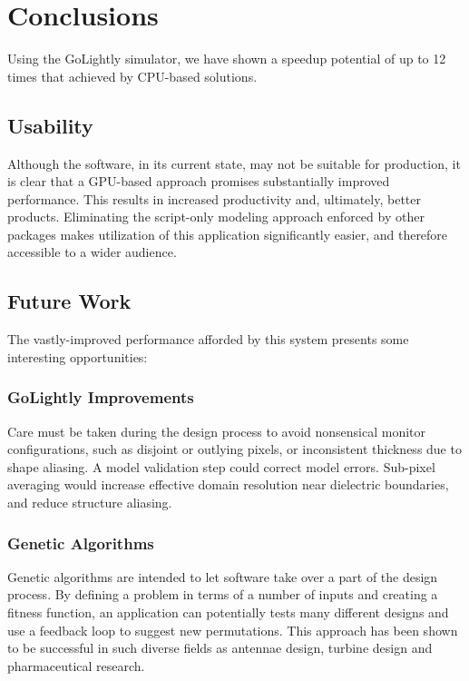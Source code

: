 \chapter{Conclusions} \label{ch:conclusions}

Using the GoLightly simulator, we have shown a speedup potential of up to 12 times that achieved by CPU-based solutions.

\section{Usability}

Although the software, in its current state, may not be suitable for production, it is clear that a GPU-based approach promises substantially improved performance. This results in increased productivity and, ultimately, better products. Eliminating the script-only modeling approach enforced by other packages makes utilization of this application significantly easier, and therefore accessible to a wider audience.

\section{Future Work}

The vastly-improved performance afforded by this system presents some interesting opportunities:

\subsection{GoLightly Improvements}

Care must be taken during the design process to avoid nonsensical monitor configurations, such as disjoint or outlying pixels, or inconsistent thickness due to shape aliasing. A model validation step could correct model errors. Sub-pixel averaging would increase effective domain resolution near dielectric boundaries, and reduce structure aliasing. 

\clearpage

\subsection{Genetic Algorithms}
Genetic algorithms\cite{Mitchell:1998:IGA:522098}\cite{Goldberg:1989:GAS:534133}  are intended to let software take over a part of the design process. By defining a problem in terms of a number of inputs and creating a fitness function, an application can potentially tests many different designs and use a feedback loop to suggest new permutations. This approach has been shown to be successful in such diverse fields as antennae design\cite{globus2006automated}, turbine design\cite{MOSETTI1994105} and pharmaceutical research\cite{Chi:2009:MLG:1651932.1652161}. 

